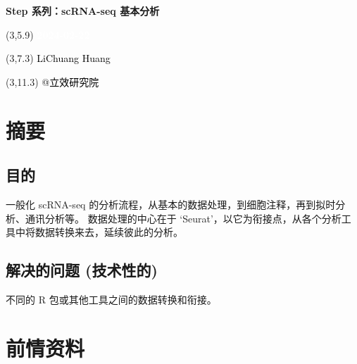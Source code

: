 \documentclass[
]{article}
\author{}
\date{\vspace{-2.5em}}
\begin{document}
\begin{titlepage} 
\begin{center} \textbf{\Huge Step 系列：scRNA-seq
基本分析} \vspace{4em}
\begin{textblock}{10}(3,5.9) \huge
\textbf{\textcolor{white}{2024-02-22}}
\end{textblock} \begin{textblock}{10}(3,7.3)
\Large \textcolor{black}{LiChuang Huang}
\end{textblock} \begin{textblock}{10}(3,11.3)
\Large \textcolor{black}{@立效研究院}
\end{textblock} \end{center} \end{titlepage}
\restoregeometry


\tableofcontents

\listoffigures

\listoftables

\newpage


\hypertarget{abstract}{%
\section{摘要}\label{abstract}}

\hypertarget{ux76eeux7684}{%
\subsection{目的}\label{ux76eeux7684}}

一般化 scRNA-seq 的分析流程，从基本的数据处理，到细胞注释，再到拟时分析、通讯分析等。
数据处理的中心在于 `Seurat'，以它为衔接点，从各个分析工具中将数据转换来去，延续彼此的分析。

\hypertarget{ux89e3ux51b3ux7684ux95eeux9898-ux6280ux672fux6027ux7684}{%
\subsection{解决的问题 (技术性的)}\label{ux89e3ux51b3ux7684ux95eeux9898-ux6280ux672fux6027ux7684}}

不同的 R 包或其他工具之间的数据转换和衔接。

\hypertarget{ux524dux60c5ux8d44ux6599}{%
\section{前情资料}\label{ux524dux60c5ux8d44ux6599}}
\end{document}
